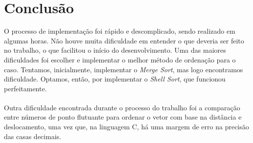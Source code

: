 \documentclass{article}
\begin{document}
\section{Conclusão}

\hspace*{\parindent}O processo de implementação foi rápido e descomplicado, sendo realizado em algumas horas. Não houve muita dificuldade em entender o que deveria ser feito no trabalho, o que facilitou o início do desenvolvimento. Uma das maiores dificuldades foi escolher e implementar o melhor método de ordenação para o caso. Tentamos, inicialmente, implementar o \textit{Merge Sort}, mas logo encontramos dificuldade. Optamos, então, por implementar o \textit{Shell Sort}, que funcionou perfeitamente.\\\\
\hspace*{\parindent}Outra dificuldade encontrada durante o processo do trabalho foi a comparação entre números de ponto flutuante para ordenar o vetor com base na distância e deslocamento, uma vez que, na linguagem C, há uma margem de erro na precisão das casas decimais.
\end{document}
